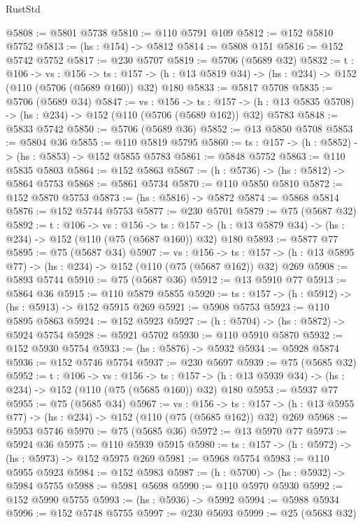 \begin{lexlean}{RustStd}
\begin{coremodule}
@5808 := @5801 @5738
@5810 := @110 @5791 @109
@5812 := @152 @5810 @5752
@5813 := (hs : @154) -> @5812
@5814 := @5808 @151
@5816 := @152 @5742 @5752
@5817 := @230 @5707
@5819 := @5706 (@5689 @32)
@5832 := {t : @106} ->
  {vs : @156} ->
  {ts : @157} -> (h : @13 @5819 @34) -> (hs : @234) -> @152 (@110 (@5706 (@5689 @160)) @32) @180
@5833 := @5817 @5708
@5835 := @5706 (@5689 @34)
@5847 := {vs : @156} ->
  {ts : @157} -> (h : @13 @5835 @5708) -> (hs : @234) -> @152 (@110 (@5706 (@5689 @162)) @32) @5783
@5848 := @5833 @5742
@5850 := @5706 (@5689 @36)
@5852 := @13 @5850 @5708
@5853 := @5804 @36
@5855 := @110 @5819 @5795
@5860 := {ts : @157} -> (h : @5852) -> (hs : @5853) -> @152 @5855 @5783
@5861 := @5848 @5752
@5863 := @110 @5835 @5803
@5864 := @152 @5863
@5867 := (h : @5736) -> (hs : @5812) -> @5864 @5753
@5868 := @5861 @5734
@5870 := @110 @5850 @5810
@5872 := @152 @5870 @5753
@5873 := (hs : @5816) -> @5872
@5874 := @5868 @5814
@5876 := @152 @5744 @5753
@5877 := @230 @5701
@5879 := @75 (@5687 @32)
@5892 := {t : @106} ->
  {vs : @156} ->
  {ts : @157} -> (h : @13 @5879 @34) -> (hs : @234) -> @152 (@110 (@75 (@5687 @160)) @32) @180
@5893 := @5877 @77
@5895 := @75 (@5687 @34)
@5907 := {vs : @156} ->
  {ts : @157} -> (h : @13 @5895 @77) -> (hs : @234) -> @152 (@110 (@75 (@5687 @162)) @32) @269
@5908 := @5893 @5744
@5910 := @75 (@5687 @36)
@5912 := @13 @5910 @77
@5913 := @5864 @36
@5915 := @110 @5879 @5855
@5920 := {ts : @157} -> (h : @5912) -> (hs : @5913) -> @152 @5915 @269
@5921 := @5908 @5753
@5923 := @110 @5895 @5863
@5924 := @152 @5923
@5927 := (h : @5704) -> (hs : @5872) -> @5924 @5754
@5928 := @5921 @5702
@5930 := @110 @5910 @5870
@5932 := @152 @5930 @5754
@5933 := (hs : @5876) -> @5932
@5934 := @5928 @5874
@5936 := @152 @5746 @5754
@5937 := @230 @5697
@5939 := @75 (@5685 @32)
@5952 := {t : @106} ->
  {vs : @156} ->
  {ts : @157} -> (h : @13 @5939 @34) -> (hs : @234) -> @152 (@110 (@75 (@5685 @160)) @32) @180
@5953 := @5937 @77
@5955 := @75 (@5685 @34)
@5967 := {vs : @156} ->
  {ts : @157} -> (h : @13 @5955 @77) -> (hs : @234) -> @152 (@110 (@75 (@5685 @162)) @32) @269
@5968 := @5953 @5746
@5970 := @75 (@5685 @36)
@5972 := @13 @5970 @77
@5973 := @5924 @36
@5975 := @110 @5939 @5915
@5980 := {ts : @157} -> (h : @5972) -> (hs : @5973) -> @152 @5975 @269
@5981 := @5968 @5754
@5983 := @110 @5955 @5923
@5984 := @152 @5983
@5987 := (h : @5700) -> (hs : @5932) -> @5984 @5755
@5988 := @5981 @5698
@5990 := @110 @5970 @5930
@5992 := @152 @5990 @5755
@5993 := (hs : @5936) -> @5992
@5994 := @5988 @5934
@5996 := @152 @5748 @5755
@5997 := @230 @5693
@5999 := @25 (@5683 @32)

\end{coremodule}
\end{lexlean}
